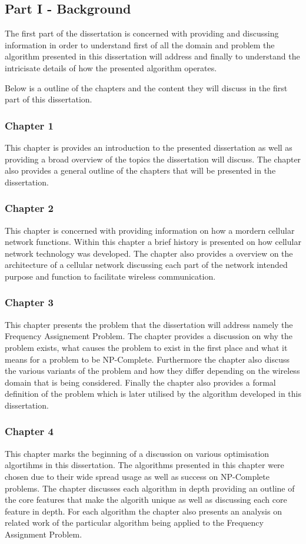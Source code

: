 \subsection{Part I - Background}
The first part of the dissertation is concerned with providing and discussing information in order to understand first of all the domain and problem the algorithm presented in this dissertation will address and finally to understand the intricisate details of how the presented algorithm operates.

Below is a outline of the chapters and the content they will discuss in the first part of this dissertation.
\subsubsection{Chapter 1}
This chapter is provides an introduction to the presented dissertation as well as providing a broad overview of the topics the dissertation will discuss. The chapter also provides a general outline of the chapters that will be presented in the dissertation.
\subsubsection{Chapter 2}
This chapter is concerned with providing information on how a mordern cellular network functions. Within this chapter a brief history is presented on how cellular network technology was developed. The chapter also provides a overview on the architecture of a cellular network discussing each part of the network intended purpose and function to facilitate wireless communication.
\subsubsection{Chapter 3}
This chapter presents the problem that the dissertation will address namely the Frequency Assignement Problem. The chapter provides a discussion on why the problem exists, what causes the problem to exist in the first place and what it means for a problem to be NP-Complete. Furthermore the chapter also discuss the various variants of the problem and how they differ depending on the wireless domain that is being considered. Finally the chapter also provides a formal definition of the problem which is later utilised by the algorithm developed in this dissertation.
\subsubsection{Chapter 4}
This chapter marks the beginning of a discussion on various optimisation algortihms in this dissertation. The algorithms presented in this chapter were chosen due to their wide spread usage as well as success on NP-Complete problems. The chapter discusses each algorithm in depth providing an outline of the core features that make the algorith unique as well as discussing each core feature in depth. For each algorithm the chapter also presents an analysis on related work of the particular algorithm being applied to the Frequency Assignment Problem. 
